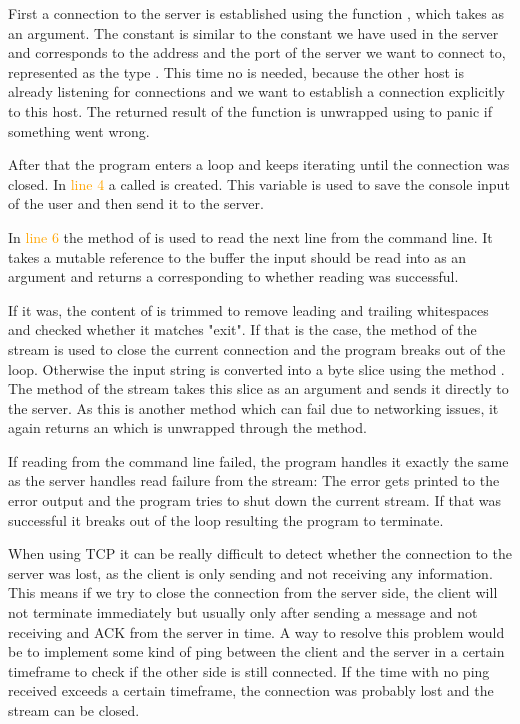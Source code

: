 First a connection to the server is established using the function , which takes
 as an argument. The constant  is similar to the constant we have used in the server and
corresponds to the address and the port of the server we want to connect to, represented as the type . This
time no  is needed, because the other host is already listening for connections and we want to
establish a connection explicitly to this host. The returned result of the function is unwrapped using  to
panic if something went wrong.

After that the program enters a loop and keeps iterating until the connection was closed. In \textcolor{orange}{line 4}
a  called  is created. This variable is used to save the console input of the user and then send
it to the server.

In \textcolor{orange}{line 6} the method  of  is used to read the next
line from the command line. It takes a mutable reference to the buffer the input should be read into as an argument and
returns a  corresponding to whether reading was successful.

If it was, the content of  is trimmed to remove leading and trailing whitespaces and checked whether it
matches "exit". If that is the case, the  method of the stream is used to close the current connection
and the program breaks out of the loop. Otherwise the input string is converted into a byte slice using
the  method . The method  of the stream takes this slice as an argument and
sends it directly to the server. As this is another method which can fail due to networking issues, it again returns an
 which is unwrapped through the  method.

If reading from the command line failed, the program handles it exactly the same as the server handles read failure
from the stream: The error gets printed to the error output and the program tries to shut down the current stream. If
that was successful it breaks out of the loop resulting the program to terminate.

When using TCP it can be really difficult to detect whether the connection to the server was lost, as the client is
only sending and not receiving any information. This means if we try to close the connection from the server side, the
client will not terminate immediately but usually only after sending a message and not receiving and ACK from the
server in time. A way to resolve this problem would be to implement some kind of ping between the client and the server
in a certain timeframe to check if the other side is still connected. If the time with no ping received exceeds a
certain timeframe, the connection was probably lost and the stream can be closed.

